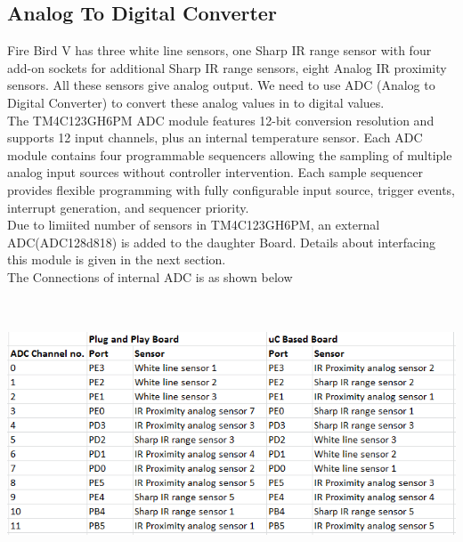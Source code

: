 \documentclass[a4paper,12pt,oneside]{article}
\begin{document}
		\subsection{\huge \textbf{Analog To Digital Converter}}
			{Fire Bird V has three white line sensors, one Sharp IR range sensor with four add-on sockets for additional Sharp IR range sensors, eight Analog IR proximity sensors. All these sensors give analog output.  We need to use ADC (Analog to Digital Converter) to convert  these analog values in to digital values.}\\
			{The TM4C123GH6PM ADC module features 12-bit conversion resolution and supports 12 input channels, plus an internal temperature sensor. Each ADC module contains four programmable sequencers allowing the sampling of multiple analog input sources without controller intervention. Each sample sequencer provides flexible programming with fully configurable input source, trigger events, interrupt generation, and sequencer priority.}\\
			{Due to limiited number of sensors in TM4C123GH6PM, an external ADC(ADC128d818) is added to the daughter Board. Details about interfacing this module is given in the next section.}\\
			The Connections of internal ADC is as shown below
			\begin{center}
				\includegraphics[width=15cm, height=8cm]{ADC}
			\end{center}
\end{document}
